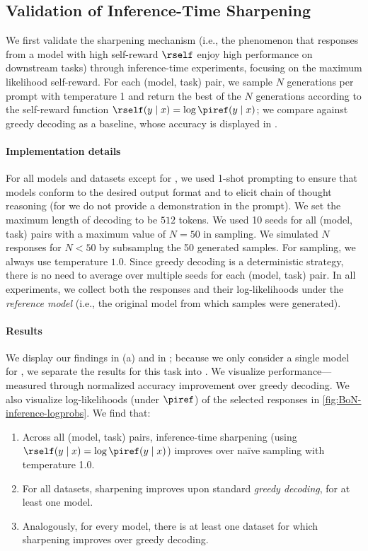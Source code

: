     \subsection{Validation of Inference-Time Sharpening}\label{ssec:inference}

    We first validate the sharpening mechanism (i.e., the phenomenon that responses from a model with high self-reward $\rself$ enjoy high performance on downstream tasks) through inference-time experiments, focusing on the maximum likelihood self-reward. For each (model, task) pair, we sample $N$ generations per prompt with temperature 1 and return the best of the $N$ generations according to the \mlsharp self-reward function $\rself(y\mid{}x)=\log\piref(y\mid{}x)$; we compare against greedy decoding as a baseline, whose accuracy is displayed in .




\paragraph{Implementation details}
For all models and datasets except for \gametwentyfour, we used 1-shot prompting to ensure that models conform to the desired output format and to elicit chain of thought reasoning (for \gametwentyfour we do not provide a demonstration in the prompt). We set the maximum length of decoding to be $512$ tokens. We used 10 seeds for all (model, task) pairs with a maximum value of $N=50$ in \BestofN sampling. We simulated $N$ responses for $N<50$ by subsamplng the 50 generated samples. For \BestofN sampling, we always use temperature $1.0$. Since greedy decoding is a deterministic strategy, there is no need to average over multiple seeds for each (model, task) pair. In all experiments, we collect both the responses and their log-likelihoods under the \emph{reference model} (i.e., the original model from which samples were generated). 

\paragraph{Results}
We display our findings in (a) and in ; because we only consider a single model for \gametwentyfour, we separate the results for this task into . We visualize performance---measured through normalized accuracy improvement over greedy decoding. We also visualize log-likelihoods (under $\piref$) of the selected responses in \cref{fig:BoN-inference-logprobs}. We find that:
\begin{enumerate}
\item Across all (model, task) pairs, inference-time \BestofN
  sharpening (using $\rself(y\mid{}x)=\log\piref(y\mid{}x)$) improves
  over na{\"i}ve sampling with temperature 1.0.
\item For all datasets, \BestofN sharpening improves upon standard \emph{greedy decoding}, for at least one model.
  \item Analogously, for every model, there is at
  least one dataset for which \BestofN sharpening improves over greedy
  decoding.
\end{enumerate}

